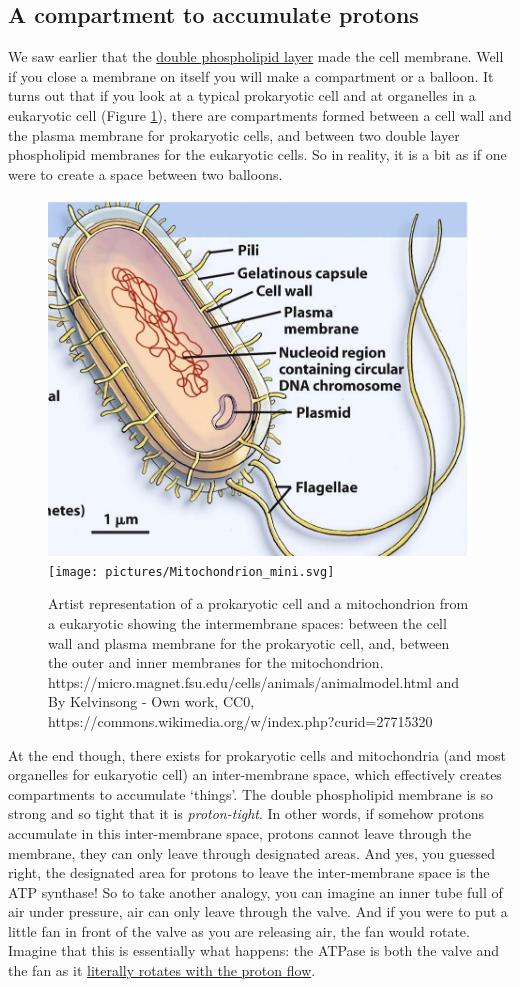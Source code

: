 \documentclass[]{book}
\theoremstyle{definition}
\theoremstyle{definition}
\theoremstyle{definition}
\theoremstyle{remark}
\begin{document}
\subsection{A compartment to accumulate
protons}\label{a-compartment-to-accumulate-protons}

We saw earlier that the \protect\hyperlink{phospholipids}{double
phospholipid layer} made the cell membrane. Well if you close a membrane
on itself you will make a compartment or a balloon. It turns out that if
you look at a typical prokaryotic cell and at organelles in a eukaryotic
cell (Figure \ref{fig:cells}), there are compartments formed between a
cell wall and the plasma membrane for prokaryotic cells, and between two
double layer phospholipid membranes for the eukaryotic cells. So in
reality, it is a bit as if one were to create a space between two
balloons.

\begin{figure}

{\centering \includegraphics[width=0.45\linewidth]{pictures/prokaryotic-cell-diagram} \texttt{[image: pictures/Mitochondrion\_mini.svg]} 

}

\caption{Artist representation of a prokaryotic cell and a mitochondrion from a eukaryotic showing the intermembrane spaces: between the cell wall and plasma membrane for the prokaryotic cell, and, between the outer and inner membranes for the mitochondrion.  https://micro.magnet.fsu.edu/cells/animals/animalmodel.html and By Kelvinsong - Own work, CC0, https://commons.wikimedia.org/w/index.php?curid=27715320}\label{fig:cells}
\end{figure}

At the end though, there exists for prokaryotic cells and mitochondria
(and most organelles for eukaryotic cell) an inter-membrane space, which
effectively creates compartments to accumulate `things'. The double
phospholipid membrane is so strong and so tight that it is
\emph{proton-tight}. In other words, if somehow protons accumulate in
this inter-membrane space, protons cannot leave through the membrane,
they can only leave through designated areas. And yes, you guessed
right, the designated area for protons to leave the inter-membrane space
is the ATP synthase! So to take another analogy, you can imagine an
inner tube full of air under pressure, air can only leave through the
valve. And if you were to put a little fan in front of the valve as you
are releasing air, the fan would rotate. Imagine that this is
essentially what happens: the ATPase is both the valve and the fan as it
\href{https://upload.wikimedia.org/wikipedia/commons/6/62/ATPsyn.gif}{literally
rotates with the proton flow}.
\end{document}
